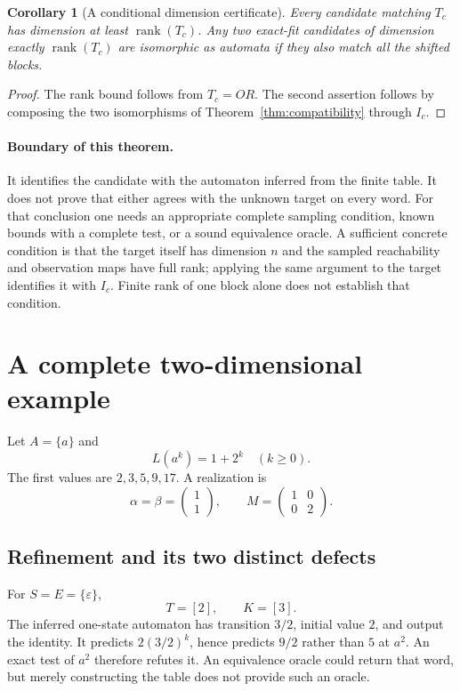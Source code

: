 \documentclass[11pt]{article}
\newtheorem{corollary}[theorem]{Corollary}
\theoremstyle{definition}
\newcommand{\rk}{\operatorname{rank}}
\begin{document}
\begin{corollary}[A conditional dimension certificate]
Every candidate matching $T_c$ has dimension at least $\rk(T_c)$. Any two
exact-fit candidates of dimension exactly $\rk(T_c)$ are isomorphic as
automata if they also match all the shifted blocks.
\end{corollary}
\begin{proof}
The rank bound follows from $T_c=OR$. The second assertion follows by
composing the two isomorphisms of Theorem~\ref{thm:compatibility} through $I_c$.
\end{proof}

\paragraph{Boundary of this theorem.}
It identifies the candidate with the automaton inferred from the finite table.
It does not prove that either agrees with the unknown target on every word.
For that conclusion one needs an appropriate complete sampling condition,
known bounds with a complete test, or a sound equivalence oracle. A sufficient
concrete condition is that the target itself has dimension $n$ and the
sampled reachability and observation maps have full rank; applying the same
argument to the target identifies it with $I_c$. Finite rank of one block
alone does not establish that condition.

\section{A complete two-dimensional example}

Let $A=\{a\}$ and
\[
L(a^k)=1+2^k\quad(k\geq0).
\]
The first values are $2,3,5,9,17$. A realization is
\[
\alpha=\beta=\begin{pmatrix}1\\1\end{pmatrix},
\qquad M=\begin{pmatrix}1&0\\0&2\end{pmatrix}.
\]

\subsection{Refinement and its two distinct defects}
For $S=E=\{\varepsilon\}$,
\[
T=[2],\qquad K=[3].
\]
The inferred one-state automaton has transition $3/2$, initial value $2$, and
output the identity. It predicts $2(3/2)^k$, hence predicts $9/2$ rather than
$5$ at $a^2$. An exact test of $a^2$ therefore refutes it. An equivalence
oracle could return that word, but merely constructing the table does not
provide such an oracle.
\end{document}
